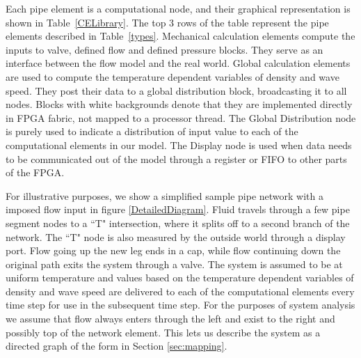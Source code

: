 Each pipe element is a computational node, and their graphical representation is shown in Table~\ref{CELibrary}. 
The top 3 rows of the table represent the pipe elements described in Table~\ref{types}.  
Mechanical calculation elements compute the inputs to valve, defined flow and defined pressure blocks.
They serve as an interface between the flow model and the real world.
Global calculation elements are used to compute the temperature dependent variables of density and wave speed. 
They post their data to a global distribution block, broadcasting it to all nodes.
Blocks with white backgrounds denote that they are implemented directly in FPGA fabric, not mapped to a processor thread.  
The Global Distribution node is purely used to indicate a distribution of input value to each of the computational elements in our model. 
The Display node is used when data needs to be communicated out of the model through a register or FIFO to other parts of the FPGA. 

For illustrative purposes, we show a simplified sample pipe network with a imposed flow input in figure \ref{DetailedDiagram}. 
Fluid travels through a few pipe segment nodes to a ``T" intersection, where it splits off to a second branch of the network.
The ``T" node is also measured by the outside world through a display port.  
Flow going up the new leg ends in a cap, while flow continuing down the original path exits the system through a valve.  
The system is assumed to be at uniform temperature and values based on the temperature dependent variables of density and wave speed are delivered to each of the computational elements every time step for use in the subsequent time step.
For the purposes of system analysis we assume that flow always enters through the left and exist to the right and possibly top of the network element.  This lets us describe the system as a directed graph of the form in Section \ref{sec:mapping}. 
%

